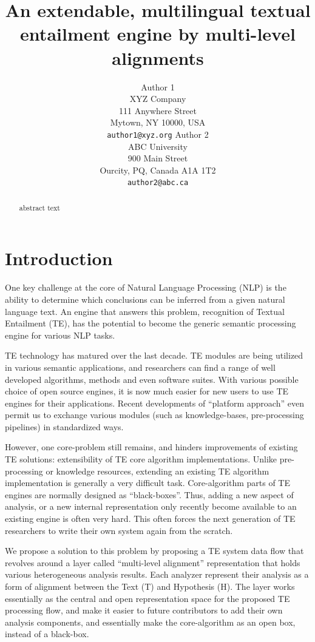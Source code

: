 \documentclass[11pt,letterpaper]{article}
\title{An extendable, multilingual textual entailment engine by
  multi-level alignments}
\author{Author 1\\
	    XYZ Company\\
	    111 Anywhere Street\\
	    Mytown, NY 10000, USA\\
	    {\tt author1@xyz.org}
	  \And
	Author 2\\
  	ABC University\\
  	900 Main Street\\
  	Ourcity, PQ, Canada A1A 1T2\\
  {\tt author2@abc.ca}}
\date{}
\begin{document}
\maketitle
\begin{abstract}
 abstract text 
\end{abstract}

\section{Introduction}
One key challenge at the core of Natural Language Processing (NLP) is
the ability to determine which conclusions can be inferred from a
given natural language text. An engine that answers this problem,
recognition of Textual Entailment (TE), has the potential to become
the generic semantic processing engine for various NLP tasks.    

TE technology has matured over the last decade. TE modules are being
utilized in various semantic applications, and researchers can find a
range of well developed algorithms, methods and even software suites. 
With various possible choice of open source engines, it is now much
easier for new users to use TE engines for their applications.
Recent developments of ``platform approach'' even permit us to
exchange various modules (such as knowledge-bases, pre-processing  
pipelines) in standardized ways.   

However, one core-problem still remains, and hinders improvements of
existing TE solutions: extensibility of TE core algorithm
implementations. Unlike pre-processing or knowledge resources,
extending an existing TE algorithm implementation is generally a very
difficult task. Core-algorithm parts of TE engines are normally
designed as ``black-boxes''. Thus, adding a new aspect of analysis, or
a new internal representation only recently become available to
an existing engine is often very hard. 
This often forces the next generation of TE researchers to write their
own system again from the scratch. 

We propose a solution to this problem by proposing a TE system data
flow that revolves around a layer called ``multi-level alignment''
representation that holds various heterogeneous analysis results. Each
analyzer represent their analysis as a form of alignment between the
Text (T) and Hypothesis (H). The layer works essentially as the
central and open representation space for the proposed TE processing
flow, and make it easier to future contributors to add their own
analysis components, and essentially make the core-algorithm as an
open box, instead of a black-box.      
\end{document}
